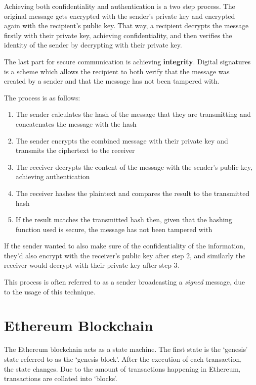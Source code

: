 Achieving both confidentiality and authentication is a two step process. The original message gets encrypted with the sender's private key and encrypted again with the recipient's public key. That way, a recipient decrypts the message firstly with their private key, achieving confidentiality, and then verifies the identity of the sender by decrypting with their private key.

The last part for secure communication is achieving \textbf{integrity}. Digital signatures is a scheme which allows the recipient to both verify that the message was created by a sender and that the message has not been tampered with. 

The process is as follows:
\begin{enumerate}
    \item The sender calculates the hash of the message that they are transmitting and concatenates the message with the hash
    \item The sender encrypts the combined message with their private key and transmits the ciphertext to the receiver  
    \item The receiver decrypts the content of the message with the sender's public key, achieving authentication
    \item The receiver hashes the plaintext and compares the result to the transmitted hash
    \item If the result matches the transmitted hash  then, given that the hashing function used is secure,
    the message has not been tampered with
\end{enumerate}

If the sender wanted to also make sure of the confidentiality of the information, they'd also encrypt with the receiver's public key after step 2, and similarly the receiver would decrypt with their private key after step 3. 

This process is often referred to as a sender broadcasting a \textit{signed} message, due to the usage of this technique.


\section{Ethereum Blockchain}
The Ethereum blockchain acts as a state machine. The first state is the `genesis' state referred to as the `genesis block'. After the execution of each transaction, the state changes. Due to the amount of transactions happening in Ethereum, transactions are collated into `blocks'. 

